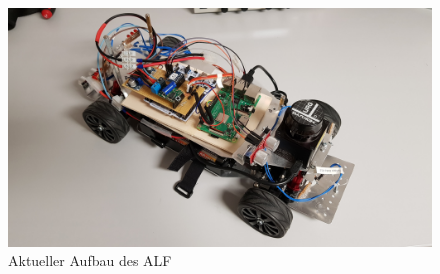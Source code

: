 


\begin{figure}[hbtp]
\centering
\includegraphics[scale=0.1]{images/chapter2/alf_new.jpg}
\caption{Aktueller Aufbau des ALF}
\label{fig:alf_new}
\end{figure}
